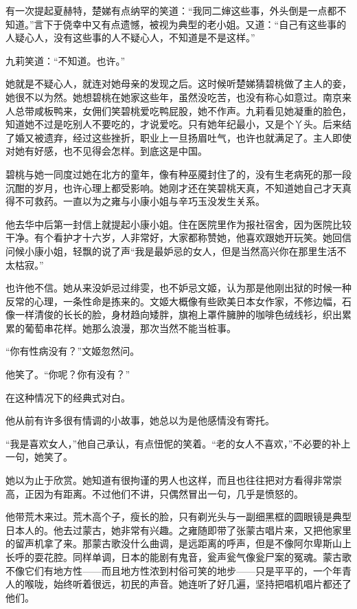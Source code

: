 \par 有一次提起夏赫特，楚娣有点纳罕的笑道：“我同二婶这些事，外头倒是一点都不知道。”言下于侥幸中又有点遗憾，被视为典型的老小姐。又道：“自己有这些事的人疑心人，没有这些事的人不疑心人，不知道是不是这样。”
\par 九莉笑道：“不知道。也许。”
\par 她就是不疑心人，就连对她母亲的发现之后。这时候听楚娣猜碧桃做了主人的妾，她很不以为然。她想碧桃在她家这些年，虽然没吃苦，也没有称心如意过。南京来人总带咸板鸭来，女佣们笑碧桃爱吃鸭屁股，她不作声。九莉看见她凝重的脸色，知道她不过是吃别人不要吃的，才说爱吃。只有她年纪最小，又是个丫头。后来结了婚又被遗弃，经过这些挫折，职业上一旦扬眉吐气，也许也就满足了。主人即使对她有好感，也不见得会怎样。到底这是中国。
\par 碧桃与她一同度过她在北方的童年，像有种巫魇封住了的，没有生老病死的那一段沉酣的岁月，也许心理上都受影响。她刚才还在笑碧桃天真，不知道她自己才天真得不可救药。一直以为之雍与小康小姐与辛巧玉没发生关系。
\par 他去华中后第一封信上就提起小康小姐。住在医院里作为报社宿舍，因为医院比较干净。有个看护才十六岁，人非常好，大家都称赞她，他喜欢跟她开玩笑。她回信问候小康小姐，轻飘的说了声“我是最妒忌的女人，但是当然高兴你在那里生活不太枯寂。”
\par 也许他不信。她从来没妒忌过绯雯，也不妒忌文姬，认为那是他刚出狱的时候一种反常的心理，一条性命是拣来的。文姬大概像有些欧美日本女作家，不修边幅，石像一样清俊的长长的脸，身材趋向矮胖，旗袍上罩件臃肿的咖啡色绒线衫，织出累累的葡萄串花样。她那么浪漫，那次当然不能当桩事。
\par “你有性病没有？”文姬忽然问。
\par 他笑了。“你呢？你有没有？”
\par 在这种情况下的经典式对白。
\par 他从前有许多很有情调的小故事，她总以为是他感情没有寄托。
\par “我是喜欢女人，”他自己承认，有点忸怩的笑着。“老的女人不喜欢，”不必要的补上一句，她笑了。
\par 她以为止于欣赏。她知道有很拘谨的男人也这样，而且也往往把对方看得非常崇高，正因为有距离。不过他们不讲，只偶然冒出一句，几乎是愤怒的。
\par 他带荒木来过。荒木高个子，瘦长的脸，只有剃光头与一副细黑框的圆眼镜是典型日本人的。他去过蒙古，她非常有兴趣。之雍随即带了张蒙古唱片来，又把他家里的留声机拿了来。那蒙古歌没什么曲调，是远距离的呼声，但是不像阿尔卑斯山上长呼的耍花腔。同样单调，日本的能剧有鬼音，瓮声瓮气像瓮尸案的冤魂。蒙古歌不像它们有地方性——而且地方性浓到村俗可笑的地步——只是平平的，一个年青人的喉咙，始终听着很远，初民的声音。她连听了好几遍，坚持把唱机唱片都还了他们。

